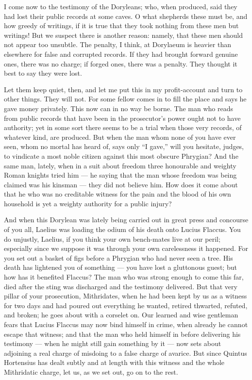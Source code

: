  I come now to the testimony of the Doryleans; who, when produced, said they had lost their public records at some caves. O what shepherds these must be, and how greedy of writings, if it is true that they took nothing from these men but writings! But we suspect there is another reason: namely, that these men should not appear too unsubtle. The penalty, I think, at Dorylaeum is heavier than elsewhere for false and corrupted records. If they had brought forward genuine ones, there was no charge; if forged ones, there was a penalty. They thought it best to say they were lost.

 Let them keep quiet, then, and let me put this in my profit-account and turn to other things. They will not. For some fellow comes in to fill the place and says he gave money privately. This now can in no way be borne. The man who reads from public records that have been in the prosecutor's power ought not to have authority; yet in some sort there seems to be a trial when those very records, of whatever kind, are produced. But when the man whom none of you have ever seen, whom no mortal has heard of, says only ``I gave,'' will you hesitate, judges, to vindicate a most noble citizen against this most obscure Phrygian? And the same man, lately, when in a suit about freedom three honourable and weighty Roman knights tried him --- he saying that the man whose freedom was being claimed was his kinsman --- they did not believe him. How does it come about that he who was no creditable witness for the pain and the blood of his own household is yet a weighty authority for a public injury?

 And when this Dorylean was lately being carried out in great press and concourse of you all, Laelius was loading the odium of his death onto Lucius Flaccus. You do unjustly, Laelius, if you think your own bench-mates live at our peril; especially since we suppose it was through your own carelessness it happened. For you set out a basket of figs before a Phrygian who had never seen a tree. His death has lightened you of something --- you have lost a gluttonous guest; but how has it benefited Flaccus? The man who was strong enough to come this far, died after the sting was discharged and the testimony delivered. But that very pillar of your prosecution, Mithridates, when he had been kept by us as a witness for two days and had poured out everything he wanted, retired thwarted, refuted, and broken; he goes about with a corselet on. Our learned and wise gentleman fears that Lucius Flaccus may now bind himself in crime, when already he cannot escape that witness; and that the man who held himself in before delivering his testimony --- when he might still gain something by it --- now sets about adjoining a real charge of misdoing to a false charge of avarice. But since Quintus Hortensius has dealt subtly and at length with this witness and the whole Mithridatic charge, let us, as we set out, go on to the rest.

